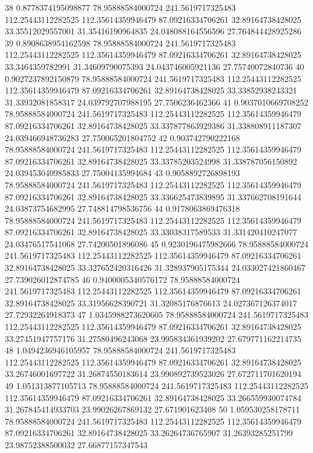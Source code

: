 {38 0.8778374195098877 78.95888584000724 241.5619717325483 112.25443112282525 112.35614359946479 87.09216334706261 32.89164738428025 33.35512029557001 31.35416190964835 24.048088164556596 27.764844428925286
39 0.8908638954162598 78.95888584000724 241.5619717325483 112.25443112282525 112.35614359946479 87.09216334706261 32.89164738428025 33.3464359782991 31.34609790075393 24.043746005921136 27.75740072840736
40 0.9027237892150879 78.95888584000724 241.5619717325483 112.25443112282525 112.35614359946479 87.09216334706261 32.89164738428025 33.33852938243321 31.33932081858317 24.039792707988195 27.7506236462366
41 0.9037010669708252 78.95888584000724 241.5619717325483 112.25443112282525 112.35614359946479 87.09216334706261 32.89164738428025 33.337877863929386 31.338808911187307 24.039466948736283 27.750065201804752
42 0.903742790222168 78.95888584000724 241.5619717325483 112.25443112282525 112.35614359946479 87.09216334706261 32.89164738428025 33.33785203524998 31.338787056150892 24.039453040985833 27.75004135994684
43 0.9058892726898193 78.95888584000724 241.5619717325483 112.25443112282525 112.35614359946479 87.09216334706261 32.89164738428025 33.336625473839895 31.337662708191644 24.03873754682995 27.748814798536756
44 0.9178063869476318 78.95888584000724 241.5619717325483 112.25443112282525 112.35614359946479 87.09216334706261 32.89164738428025 33.33038317589533 31.331420410247077 24.03476517541068 27.74200501896086
45 0.9230196475982666 78.95888584000724 241.5619717325483 112.25443112282525 112.35614359946479 87.09216334706261 32.89164738428025 33.327652420316426 31.328937905175344 24.033027421860467 27.739026012874785
46 0.9400005340576172 78.95888584000724 241.5619717325483 112.25443112282525 112.35614359946479 87.09216334706261 32.89164738428025 33.31956628390721 31.32085176876613 24.027367126374017 27.72932264918373
47 1.0345988273620605 78.95888584000724 241.5619717325483 112.25443112282525 112.35614359946479 87.09216334706261 32.89164738428025 33.27451947757176 31.27580496243068 23.995834361939202 27.679771162214735
48 1.0494236946105957 78.95888584000724 241.5619717325483 112.25443112282525 112.35614359946479 87.09216334706261 32.89164738428025 33.26746001697722 31.26874550183614 23.990892739523026 27.672711701620194
49 1.051313877105713 78.95888584000724 241.5619717325483 112.25443112282525 112.35614359946479 87.09216334706261 32.89164738428025 33.266559930074784 31.267845414933703 23.99026267869132 27.671901623408
50 1.059530258178711 78.95888584000724 241.5619717325483 112.25443112282525 112.35614359946479 87.09216334706261 32.89164738428025 33.26264736765907 31.26393285251799 23.98752388500032 27.66877157347543
}
